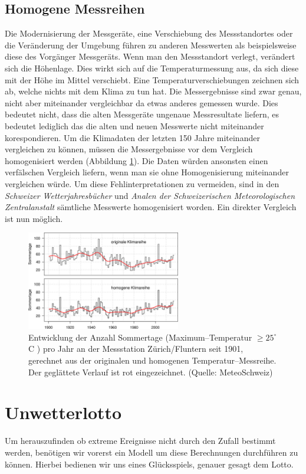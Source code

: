 \begin{refsection}
\subsection{Homogene Messreihen}
Die Modernisierung der Messgeräte,  eine Verschiebung des Messstandortes oder die Veränderung der Umgebung führen zu anderen Messwerten als beispielsweise diese des Vorgänger Messgeräts. Wenn man den Messstandort verlegt, verändert sich die Höhenlage. Dies wirkt sich auf die Temperaturmessung aus, da sich diese mit der Höhe im Mittel verschiebt. Eine Temperaturverschiebungen zeichnen sich ab, welche nichts mit dem Klima zu tun hat. Die Messergebnisse sind zwar genau, nicht aber miteinander vergleichbar da etwas anderes gemessen wurde.
Dies bedeutet nicht, dass die alten Messgeräte ungenaue Messresultate liefern, es bedeutet lediglich das die alten und neuen Messwerte nicht miteinander korespondieren. 
Um die Klimadaten der letzten 150 Jahre miteinander vergleichen zu können, müssen die Messergebnisse vor dem Vergleich homogenisiert werden (Abbildung \ref{Homogen}). Die Daten würden ansonsten einen verfälschen Vergleich liefern, wenn man sie ohne Homogenisierung miteinander vergleichen würde.
Um diese Fehlinterpretationen zu vermeiden, sind in den \textit{Schweizer Wetterjahresbücher} und \textit{Analen der Schweizerischen Meteorologischen Zentralanstalt} sämtliche Messwerte homogenisiert worden. Ein direkter Vergleich ist nun möglich.

\begin{figure}
\centering
\includegraphics[width=0.6\textwidth]{extrem/Homogen.jpg}
\caption{Entwicklung der Anzahl Sommertage (Maximum--Temperatur $\ge 25^{\circ}$C ) pro Jahr an der Messstation Zürich/Fluntern seit 1901, gerechnet aus der originalen und homogenen Temperatur--Messreihe. Der geglättete Verlauf ist rot eingezeichnet. (Quelle: MeteoSchweiz)}
\label{Homogen}
\end{figure}


\section{Unwetterlotto}
Um herauszufinden ob extreme Ereignisse nicht durch den Zufall bestimmt werden, benötigen wir vorerst ein Modell um diese Berechnungen durchführen zu können.
Hierbei bedienen wir uns eines Glücksspiels, genauer gesagt dem Lotto.


\end{refsection}
